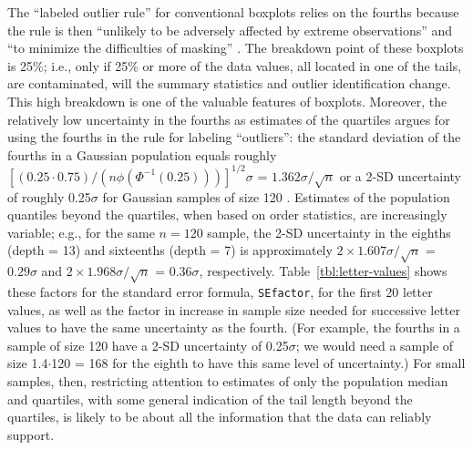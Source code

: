 \documentclass[oneside]{article}
\begin{document}
The ``labeled outlier rule'' for conventional boxplots relies on the fourths because the rule is then ``unlikely to be adversely affected by extreme observations'' and ``to minimize the difficulties of masking'' \citep[pg. 992]{dchbox}. The breakdown point of these boxplots is 25\%; i.e., only if 25\% or more of the data values, all located in one of the tails, are contaminated, will the summary statistics and outlier identification change. This high breakdown is one of the valuable features of boxplots. Moreover, the relatively low uncertainty in the fourths as estimates of the quartiles argues for using the fourths in the rule for labeling ``outliers'': the standard deviation of the fourths in a Gaussian population equals roughly $[(0.25 \cdot 0.75) / (n \phi(\Phi^{-1}(0.25)))]^{1/2} \sigma$ = $1.362 \sigma / \sqrt{n}$ or a 2-SD uncertainty of roughly 0.25$\sigma$ for Gaussian samples of size 120 \citep{ha.order}. Estimates of the population quantiles beyond the quartiles, when based on order statistics, are increasingly variable; e.g., for the same $n = 120$ sample, the 2-SD uncertainty in the eighths (depth = 13) and sixteenths (depth = 7) is approximately $ 2 \times 1.607 \sigma / \sqrt{n}$ = $0.29 \sigma$ and $ 2 \times 1.968 \sigma / \sqrt{n}$ = $0.36 \sigma$, respectively. Table~\ref{tbl:letter-values} shows these factors for the standard error formula, \texttt{SEfactor}, for the first 20 letter values, as well as the factor in increase in sample size needed for successive letter values to have the same uncertainty as the fourth. (For example, the fourths in a sample of size 120 have a 2-SD uncertainty of 0.25$\sigma$; we would need a sample of size 1.4$\cdot$120 = 168 for the eighth to have this same level of uncertainty.) For small samples, then, restricting attention to estimates of only the population median and quartiles, with some general indication of the tail length beyond the quartiles, is likely to be about all the information that the data can reliably support.
\end{document}
